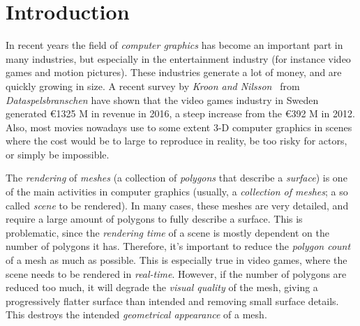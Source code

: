 

\chapter{Introduction}
\label{cha:introduction}

In recent years the field of \emph{computer graphics} has become an important part in many industries, but especially in the entertainment industry (for instance video games and motion pictures). These industries generate a lot of money, and are quickly growing in size. A recent survey by \emph{Kroon and Nilsson}~\cite{kroon2017game} from \emph{Dataspelsbranschen} have shown that the video games industry in Sweden generated \euro 1325 M in revenue in 2016, a steep increase from the \euro 392 M in 2012. Also, most movies nowadays use to some extent 3-D computer graphics in scenes where the cost would be to large to reproduce in reality, be too risky for actors, or simply be impossible.

The \emph{rendering} of \emph{meshes} (a collection of \emph{polygons} that describe a \emph{surface}) is one of the main activities in computer graphics (usually, a \emph{collection of meshes}; a so called \emph{scene} to be rendered). In many cases, these meshes are very detailed, and require a large amount of polygons to fully describe a surface. This is problematic, since the \emph{rendering time} of a scene is mostly dependent on the number of polygons it has. Therefore, it's important to reduce the \emph{polygon count} of a mesh as much as possible. This is especially true in video games, where the scene needs to be rendered in \emph{real-time}. However, if the number of polygons are reduced too much, it will degrade the \emph{visual quality} of the mesh, giving a progressively flatter surface than intended and removing small surface details. This destroys the intended \emph{geometrical appearance} of a mesh.

